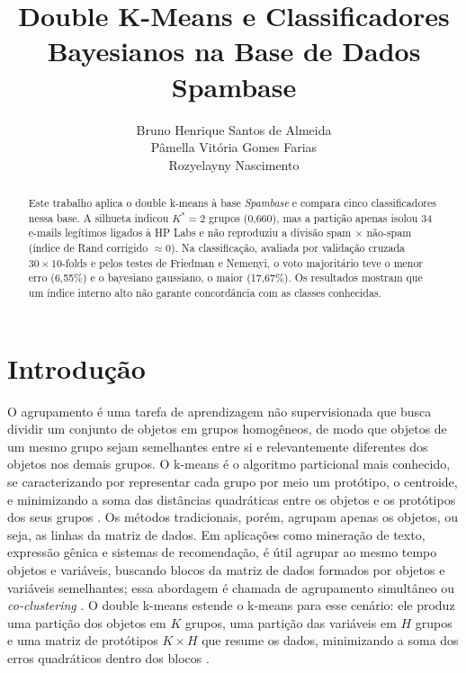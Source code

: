 \documentclass[12pt,reqno]{amsart}
\begin{document}
\title{Double K-Means e Classificadores Bayesianos na Base de Dados Spambase}

\author{Bruno Henrique Santos de Almeida \\
Pâmella Vitória Gomes Farias \\
Rozyelayny Nascimento} 

\address{Universidade Federal de Pernambuco \\
Programa de Pós Graduação em Ciência da Computação}


\begin{abstract}
Este trabalho aplica o double k-means à base \emph{Spambase} e compara cinco classificadores
nessa base. A silhueta indicou $K^*=2$ grupos (0,660), mas a partição apenas isolou 34 e-mails
legítimos ligados à HP Labs e não reproduziu a divisão spam $\times$ não-spam (índice de Rand
corrigido $\approx 0$). Na classificação, avaliada por validação cruzada $30\times10$-folds e
pelos testes de Friedman e Nemenyi, o voto majoritário teve o menor erro (6,55\%) e o bayesiano
gaussiano, o maior (17,67\%). Os resultados mostram que um índice interno alto não garante
concordância com as classes conhecidas.

\end{abstract}

\maketitle 

\section{Introdução}

O agrupamento é uma tarefa de aprendizagem não supervisionada que busca
dividir um conjunto de objetos em grupos homogêneos, de modo que objetos de um mesmo grupo sejam semelhantes entre si e relevantemente diferentes dos objetos nos demais grupos. O k-means \cite{macqueen1967} é o
algoritmo particional mais conhecido, se caracterizando por representar cada grupo por meio um protótipo, o centroide, e
minimizando a soma das distâncias quadráticas entre os objetos e os protótipos dos seus grupos
\cite{jain2010}. Os métodos tradicionais, porém, agrupam apenas os objetos, ou seja, as linhas da matriz
de dados. Em aplicações como mineração de texto, expressão gênica e sistemas de recomendação, é
útil agrupar ao mesmo tempo objetos e variáveis, buscando blocos da matriz de dados formados por
objetos e variáveis semelhantes; essa abordagem é chamada de agrupamento simultâneo ou
\emph{co-clustering} \cite{hartigan1972}. O double k-means estende o k-means
para esse cenário: ele produz uma partição dos objetos em $K$ grupos, uma partição das variáveis
em $H$ grupos e uma matriz de protótipos $K\times H$ que resume os dados, minimizando a soma dos
erros quadráticos dentro dos blocos \cite{vichi2001}.
\end{document}
